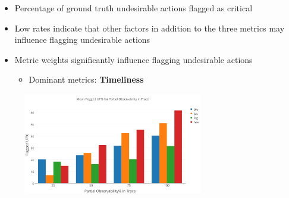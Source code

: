 \begin{frame}
\begin{itemize}
\item Percentage of ground truth undesirable actions flagged as critical
\item  Low rates indicate that other factors in addition to the three metrics may influence flagging  undesirable actions
\item Metric weights significantly influence flagging undesirable actions
\begin{itemize}
\item Dominant metrics: \textbf{Timeliness}
\end{itemize}
\end{itemize}
\begin{figure}
     \centering
      \includegraphics[width=0.7\textwidth]{../img/flaggedup.png}
\end{figure}

\end{frame}

